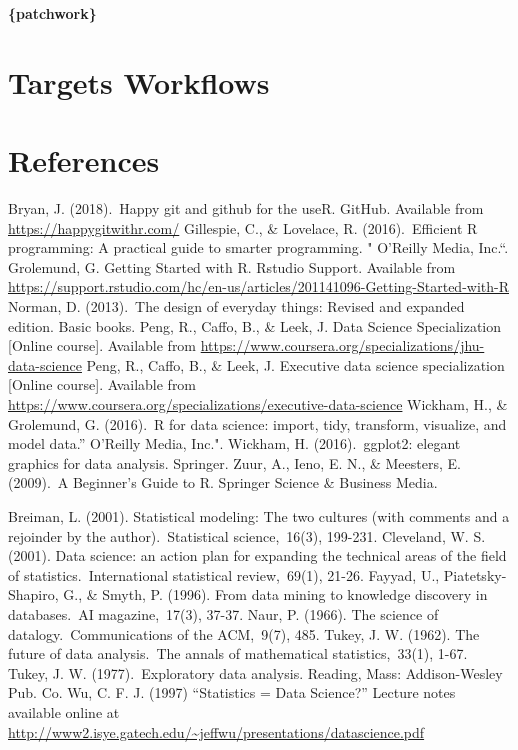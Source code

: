 \documentclass[
]{book}
\begin{document}
\textbf{\{patchwork\}}

\hypertarget{targets}{%
\chapter{Targets Workflows}\label{targets}}

\hypertarget{references}{%
\chapter*{References}\label{references}}

Bryan, J. (2018).~Happy git and github for the useR. GitHub. Available from \url{https://happygitwithr.com/}
Gillespie, C., \& Lovelace, R. (2016).~Efficient R programming: A practical guide to smarter programming. " O'Reilly Media, Inc.``.
Grolemund, G. Getting Started with R. Rstudio Support. Available from \url{https://support.rstudio.com/hc/en-us/articles/201141096-Getting-Started-with-R}
Norman, D. (2013).~The design of everyday things: Revised and expanded edition. Basic books.
Peng, R., Caffo, B., \& Leek, J. Data Science Specialization {[}Online course{]}. Available from \url{https://www.coursera.org/specializations/jhu-data-science}
Peng, R., Caffo, B., \& Leek, J. Executive data science specialization {[}Online course{]}. Available from \url{https://www.coursera.org/specializations/executive-data-science}
Wickham, H., \& Grolemund, G. (2016).~R for data science: import, tidy, transform, visualize, and model data.'' O'Reilly Media, Inc.".
Wickham, H. (2016).~ggplot2: elegant graphics for data analysis. Springer.
Zuur, A., Ieno, E. N., \& Meesters, E. (2009).~A Beginner's Guide to R. Springer Science \& Business Media.

Breiman, L. (2001). Statistical modeling: The two cultures (with comments and a rejoinder by the author).~Statistical science,~16(3), 199-231.
Cleveland, W. S. (2001). Data science: an action plan for expanding the technical areas of the field of statistics.~International statistical review,~69(1), 21-26.
Fayyad, U., Piatetsky-Shapiro, G., \& Smyth, P. (1996). From data mining to knowledge discovery in databases.~AI magazine,~17(3), 37-37.
Naur, P. (1966). The science of datalogy.~Communications of the ACM,~9(7), 485.
Tukey, J. W. (1962). The future of data analysis.~The annals of mathematical statistics,~33(1), 1-67.
Tukey, J. W. (1977).~Exploratory data analysis. Reading, Mass: Addison-Wesley Pub. Co.
Wu, C. F. J. (1997) ``Statistics = Data Science?'' Lecture notes available online at \url{http://www2.isye.gatech.edu/~jeffwu/presentations/datascience.pdf}

  
\end{document}
